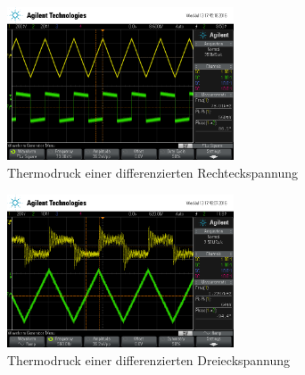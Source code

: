 \begin{figure}
	\centering
	\includegraphics[width=0.6\textwidth]{img/scope_5_diff_rechteck.png}
	\caption{Thermodruck einer differenzierten Rechteckspannung}
	\label{fig:diffrechteck}
\end{figure}

\begin{figure}
	\centering
	\includegraphics[width=0.6\textwidth]{img/scope_6_diff_dreieck.png}
	\caption{Thermodruck einer differenzierten Dreieckspannung}
	\label{fig:diffdreieck}
\end{figure}